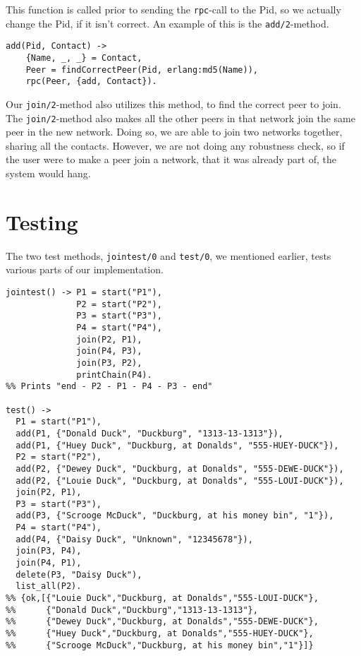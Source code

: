 \documentclass[10pt, a4paper]{article}
\begin{document}
This function is called prior to sending the \texttt{rpc}-call to the Pid, so we actually change the Pid, if it isn't correct.
An example of this is the \texttt{add/2}-method.

\begin{lstlisting}
add(Pid, Contact) ->
    {Name, _, _} = Contact,
    Peer = findCorrectPeer(Pid, erlang:md5(Name)),
    rpc(Peer, {add, Contact}).	
\end{lstlisting}

Our \texttt{join/2}-method also utilizes this method, to find the correct peer to join.
The \texttt{join/2}-method also makes all the other peers in that network join the same peer in the new network.
Doing so, we are able to join two networks together, sharing all the contacts.
However, we are not doing any robustness check, so if the user were to make a peer join a network, that it was already part of, the system would hang.

\section{Testing} %
\label{sec:testing}

The two test methods, \texttt{jointest/0} and \texttt{test/0}, we mentioned earlier, tests various parts of our implementation.

\begin{lstlisting}
jointest() -> P1 = start("P1"),
              P2 = start("P2"),
              P3 = start("P3"),
              P4 = start("P4"),
              join(P2, P1),
              join(P4, P3),
              join(P3, P2),
              printChain(P4).
%% Prints "end - P2 - P1 - P4 - P3 - end"

test() -> 
  P1 = start("P1"),
  add(P1, {"Donald Duck", "Duckburg", "1313-13-1313"}),
  add(P1, {"Huey Duck", "Duckburg, at Donalds", "555-HUEY-DUCK"}),
  P2 = start("P2"),
  add(P2, {"Dewey Duck", "Duckburg, at Donalds", "555-DEWE-DUCK"}),
  add(P2, {"Louie Duck", "Duckburg, at Donalds", "555-LOUI-DUCK"}),
  join(P2, P1),
  P3 = start("P3"),
  add(P3, {"Scrooge McDuck", "Duckburg, at his money bin", "1"}),
  P4 = start("P4"),
  add(P4, {"Daisy Duck", "Unknown", "12345678"}),
  join(P3, P4),
  join(P4, P1),
  delete(P3, "Daisy Duck"),
  list_all(P2).
%% {ok,[{"Louie Duck","Duckburg, at Donalds","555-LOUI-DUCK"},
%%      {"Donald Duck","Duckburg","1313-13-1313"},
%%      {"Dewey Duck","Duckburg, at Donalds","555-DEWE-DUCK"},
%%      {"Huey Duck","Duckburg, at Donalds","555-HUEY-DUCK"},
%%      {"Scrooge McDuck","Duckburg, at his money bin","1"}]}
\end{lstlisting}
\end{document}
